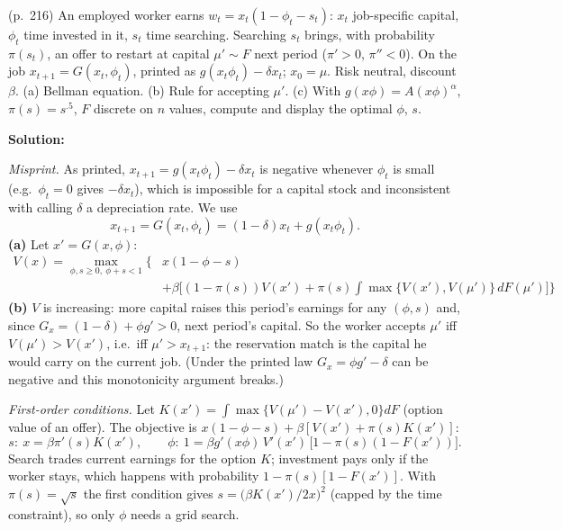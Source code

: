 \documentclass[12pt, letterpaper]{article}
\begin{document}
\begin{tcolorbox}[evenbox,title={Exercise 6.18 \quad Jovanovic (1979b)}]
\begin{tcolorbox}[questionbox]
(p.~216) An employed worker earns $w_t=x_t(1-\phi_t-s_t)$: $x_t$ job-specific capital, $\phi_t$ time invested in it, $s_t$
time searching. Searching $s_t$ brings, with probability $\pi(s_t)$, an offer to restart at capital $\mu'\sim F$ next
period ($\pi'>0$, $\pi''<0$). On the job $x_{t+1}=G(x_t,\phi_t)$, printed as $g(x_t\phi_t)-\delta x_t$; $x_0=\mu$. Risk
neutral, discount $\beta$. (a) Bellman equation. (b) Rule for accepting $\mu'$. (c) With $g(x\phi)=A(x\phi)^\alpha$,
$\pi(s)=s^{.5}$, $F$ discrete on $n$ values, compute and display the optimal $\phi$, $s$.
\end{tcolorbox}

\textbf{Solution:}

\emph{Misprint.} As printed, $x_{t+1}=g(x_t\phi_t)-\delta x_t$ is negative whenever $\phi_t$ is small (e.g.\ $\phi_t=0$
gives $-\delta x_t$), which is impossible for a capital stock and inconsistent with calling $\delta$ a depreciation
rate. We use
\[
x_{t+1}=G(x_t,\phi_t)=(1-\delta)x_t+g(x_t\phi_t).
\]
\textbf{(a)} Let $x'=G(x,\phi)$:
\[
\boxed{\begin{aligned}V(x)=\max_{\phi,s\ge0,\ \phi+s<1}\Big\{&x(1-\phi-s)\\&+\beta\Big[(1-\pi(s))V(x')+\pi(s)\int\max\{V(x'),V(\mu')\}\,dF(\mu')\Big]\Big\}\end{aligned}}
\]
\textbf{(b)} $V$ is increasing: more capital raises this period's earnings for any $(\phi,s)$ and, since
$G_x=(1-\delta)+\phi g'>0$, next period's capital. So the worker accepts $\mu'$ iff $V(\mu')>V(x')$, i.e.\ iff
$\boxed{\mu'>x_{t+1}}$: the reservation match is the capital he would carry on the current job.
(Under the printed law $G_x=\phi g'-\delta$ can be negative and this monotonicity argument breaks.)

\emph{First-order conditions.} Let $K(x')=\int\max\{V(\mu')-V(x'),0\}dF$ (option value of an offer). The
objective is $x(1-\phi-s)+\beta[V(x')+\pi(s)K(x')]$:
\[
s:\ x=\beta\pi'(s)K(x'),\qquad
\phi:\ 1=\beta g'(x\phi)\,V'(x')\,\big[1-\pi(s)(1-F(x'))\big].
\]
Search trades current earnings for the option $K$; investment pays only if the worker stays, which
happens with probability $1-\pi(s)[1-F(x')]$. With $\pi(s)=\sqrt s$ the first condition gives
$s=\big(\beta K(x')/2x\big)^2$ (capped by the time constraint), so only $\phi$ needs a grid search.


\end{tcolorbox}
\end{document}
